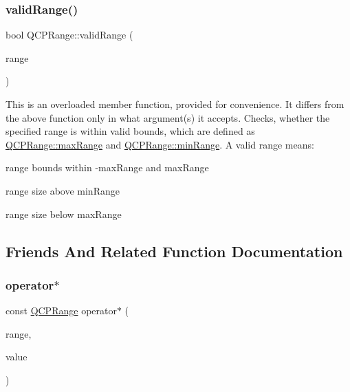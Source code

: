 \subsubsection{\texorpdfstring{valid\+Range()}{validRange()}\hspace{0.1cm}{\footnotesize\ttfamily [2/2]}}
{\footnotesize\ttfamily bool Q\+C\+P\+Range\+::valid\+Range (\begin{DoxyParamCaption}\item[{const \hyperlink{class_q_c_p_range}{Q\+C\+P\+Range} \&}]{range }\end{DoxyParamCaption})\hspace{0.3cm}{\ttfamily [static]}}

This is an overloaded member function, provided for convenience. It differs from the above function only in what argument(s) it accepts. Checks, whether the specified range is within valid bounds, which are defined as \hyperlink{class_q_c_p_range_a5ca51e7a2dc5dc0d49527ab171fe1f4f}{Q\+C\+P\+Range\+::max\+Range} and \hyperlink{class_q_c_p_range_ab46d3bc95030ee25efda41b89e2b616b}{Q\+C\+P\+Range\+::min\+Range}. A valid range means\+: \begin{DoxyItemize}
\item range bounds within -\/max\+Range and max\+Range \item range size above min\+Range \item range size below max\+Range \end{DoxyItemize}


\subsection{Friends And Related Function Documentation}
\mbox{\label{class_q_c_p_range_a558b1248ff6a9e41fd5b2630555a8acc}} 
\subsubsection{\texorpdfstring{operator$\ast$}{operator*}\hspace{0.1cm}{\footnotesize\ttfamily [1/2]}}
{\footnotesize\ttfamily const \hyperlink{class_q_c_p_range}{Q\+C\+P\+Range} operator$\ast$ (\begin{DoxyParamCaption}\item[{const \hyperlink{class_q_c_p_range}{Q\+C\+P\+Range} \&}]{range,  }\item[{double}]{value }\end{DoxyParamCaption})\hspace{0.3cm}{\ttfamily [friend]}}


